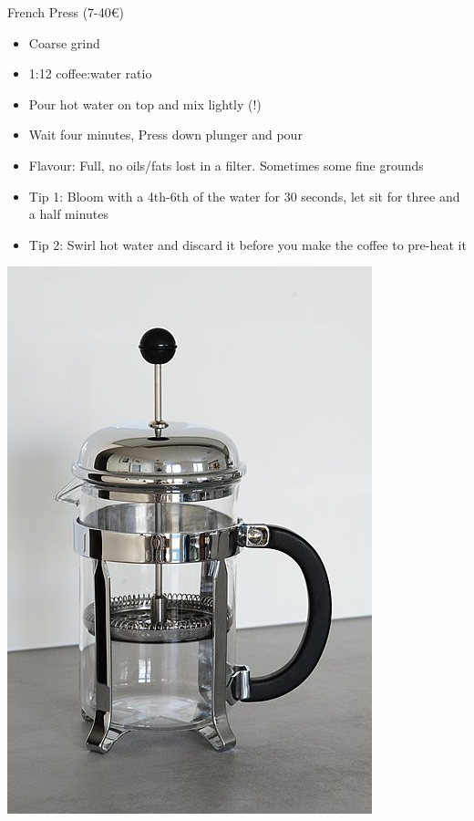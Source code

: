 \documentclass[10pt,graphics,aspectratio=169,table]{beamer}
\begin{document}
\begin{frame}{French Press (7-40€)}
    \begin{itemize}
        \item Coarse grind
        \item 1:12 coffee:water ratio
        \item Pour hot water on top and mix lightly (!)
        \item Wait four minutes, Press down plunger and pour
        \item Flavour: Full, no oils/fats lost in a filter. Sometimes some fine grounds
        \item Tip 1: Bloom with a 4th-6th of the water for 30 seconds, let sit for three and a half minutes
        \item Tip 2: Swirl hot water and discard it before you make the coffee to pre-heat it
    \end{itemize}
    \includegraphics[scale=0.16]{img/400px-French_press_2020.jpg} \cite{frenchPress}
\end{frame}
\end{document}
